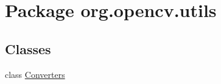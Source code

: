 \hypertarget{namespaceorg_1_1opencv_1_1utils}{}\section{Package org.\+opencv.\+utils}
\label{namespaceorg_1_1opencv_1_1utils}
\subsection*{Classes}
\begin{DoxyCompactItemize}
\item 
class \mbox{\hyperlink{classorg_1_1opencv_1_1utils_1_1_converters}{Converters}}
\end{DoxyCompactItemize}
